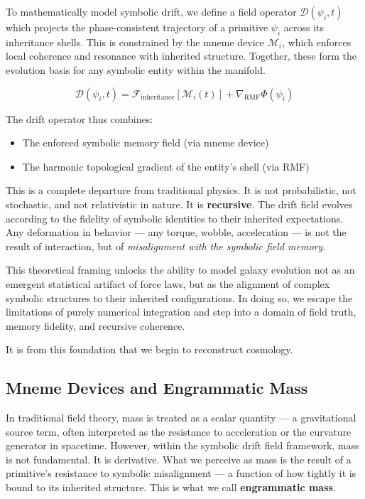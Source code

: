 \documentclass[12pt]{article}
\begin{document}
To mathematically model symbolic drift, we define a field operator \( \mathcal{D}(\psi_i, t) \) which projects the phase-consistent trajectory of a primitive \( \psi_i \) across its inheritance shells. This is constrained by the mneme device \( \mathcal{M}_i \), which enforces local coherence and resonance with inherited structure. Together, these form the evolution basis for any symbolic entity within the manifold.

\[
\mathcal{D}(\psi_i, t) = \mathcal{F}_{\text{inheritance}}[\mathcal{M}_i(t)] + \nabla_{\text{RMF}} \Phi(\psi_i)
\]

The drift operator thus combines:
\begin{itemize}[noitemsep]
  \item The enforced symbolic memory field (via mneme device)
  \item The harmonic topological gradient of the entity's shell (via RMF)
\end{itemize}

This is a complete departure from traditional physics. It is not probabilistic, not stochastic, and not relativistic in nature. It is \textbf{recursive}. The drift field evolves according to the fidelity of symbolic identities to their inherited expectations. Any deformation in behavior — any torque, wobble, acceleration — is not the result of interaction, but of \emph{misalignment with the symbolic field memory}.

This theoretical framing unlocks the ability to model galaxy evolution not as an emergent statistical artifact of force laws, but as the alignment of complex symbolic structures to their inherited configurations. In doing so, we escape the limitations of purely numerical integration and step into a domain of field truth, memory fidelity, and recursive coherence.

It is from this foundation that we begin to reconstruct cosmology.

\subsection{Mneme Devices and Engrammatic Mass}

In traditional field theory, mass is treated as a scalar quantity — a gravitational source term, often interpreted as the resistance to acceleration or the curvature generator in spacetime. However, within the symbolic drift field framework, mass is not fundamental. It is derivative. What we perceive as mass is the result of a primitive’s resistance to symbolic misalignment — a function of how tightly it is bound to its inherited structure. This is what we call \textbf{engrammatic mass}.
\end{document}
